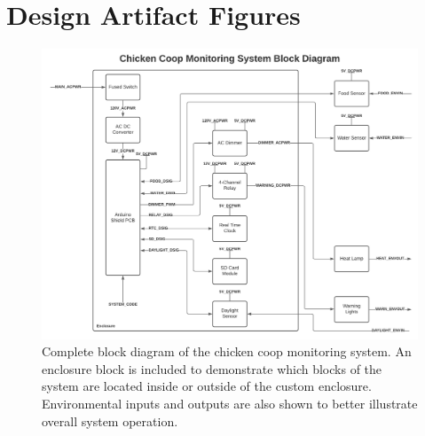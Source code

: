 \documentclass{article}
\begin{document}
\section{Design Artifact Figures}

\begin{figure}[H]
    \centering
    \includegraphics[width=\textwidth]{fig/block-diagram.pdf}
    \caption{Complete block diagram of the chicken coop monitoring system. An enclosure block is included to demonstrate which blocks of the system are located inside or outside of the custom enclosure.  Environmental inputs and outputs are also shown to better illustrate overall system operation.}
    \label{fig:block-diagram}
\end{figure}
\end{document}
